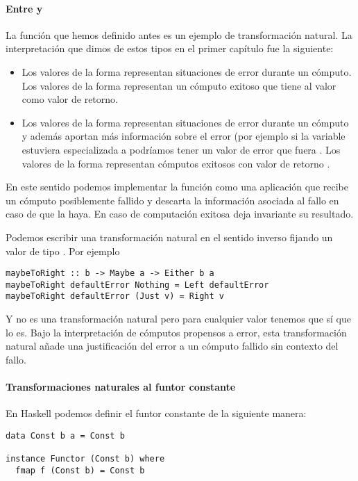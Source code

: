 \paragraph{Entre  y }
La función  que hemos definido
antes es un ejemplo de transformación natural. La interpretación
que dimos de estos tipos en el primer capítulo fue la siguiente:
\begin{itemize}
\item Los valores de la forma  representan
  situaciones de error durante un cómputo. Los valores de la forma
   representan un cómputo exitoso que tiene
  al valor  como valor de retorno.
\item Los valores de la forma  representan
  situaciones de error durante un cómputo y además aportan más información
  sobre el error (por ejemplo si la variable  estuviera
  especializada a  podríamos tener un valor de error
  que fuera . Los
  valores de la forma  representan cómputos
  exitosos con valor de retorno .
\end{itemize}

En este sentido podemos implementar la función  como
una aplicación que recibe un cómputo posiblemente fallido y descarta
la información asociada al fallo en caso de que la haya. En caso de
computación exitosa deja invariante su resultado.

Podemos escribir una transformación natural en el sentido inverso
fijando un valor de tipo . Por ejemplo

\begin{verbatim}
maybeToRight :: b -> Maybe a -> Either b a
maybeToRight defaultError Nothing = Left defaultError
maybeToRight defaultError (Just v) = Right v
\end{verbatim}

Y  no es una transformación natural pero para
cualquier valor  tenemos que
 sí que lo es. Bajo
la interpretación de cómputos propensos a error, esta transformación
natural añade una justificación del error a un cómputo fallido
sin contexto del fallo.

\paragraph{Transformaciones naturales al funtor constante}
En Haskell podemos definir el funtor constante de la siguiente
manera:
\begin{verbatim}
data Const b a = Const b

instance Functor (Const b) where
  fmap f (Const b) = Const b
\end{verbatim}

